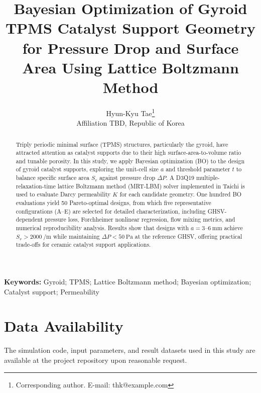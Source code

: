 \documentclass[12pt,a4paper]{article}
\begin{document}
\title{Bayesian Optimization of Gyroid TPMS Catalyst Support Geometry
  for Pressure Drop and Surface Area Using Lattice Boltzmann Method}

\author{Hyun-Kyu Tae\footnote{Corresponding author. E-mail: thk@example.com} \\
  \small Affiliation TBD, Republic of Korea}

\date{}
\maketitle

\begin{abstract}
Triply periodic minimal surface (TPMS) structures, particularly the gyroid,
have attracted attention as catalyst supports due to their high surface-area-to-volume
ratio and tunable porosity. In this study, we apply Bayesian optimization (BO)
to the design of gyroid catalyst supports, exploring the unit-cell size $a$
and threshold parameter $t$ to balance specific surface area $S_v$ against
pressure drop $\Delta P$. A D3Q19 multiple-relaxation-time lattice Boltzmann
method (MRT-LBM) solver implemented in Taichi is used to evaluate
Darcy permeability $K$ for each candidate geometry. One hundred BO evaluations
yield 50 Pareto-optimal designs, from which five representative configurations
(A--E) are selected for detailed characterization, including GHSV-dependent
pressure loss, Forchheimer nonlinear regression, flow mixing metrics,
and numerical reproducibility analysis.  Results show that designs with
$a = 3$--$\SI{6}{\milli\meter}$ achieve $S_v > \SI{2000}{\per\meter}$
while maintaining $\Delta P < \SI{50}{\pascal}$ at the reference GHSV,
offering practical trade-offs for ceramic catalyst support applications.
\end{abstract}

\noindent\textbf{Keywords:} Gyroid; TPMS; Lattice Boltzmann method;
Bayesian optimization; Catalyst support; Permeability







\section*{Data Availability}
The simulation code, input parameters, and result datasets used in this study
are available at the project repository upon reasonable request.
\end{document}
